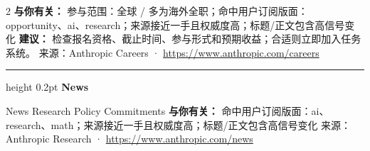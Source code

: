 \documentclass[10.5pt]{ctexart}
\begin{document}
\begin{multicols}{2}
\textbf{与你有关：} 参与范围：全球 / 多为海外全职；命中用户订阅版面：opportunity、ai、research；来源接近一手且权威度高；标题/正文包含高信号变化
\textbf{建议：} 检查报名资格、截止时间、参与形式和预期收益；合适则立即加入任务系统。
{\footnotesize\color{ormuted} 来源：Anthropic Careers · \url{https://www.anthropic.com/careers}}
\vspace{2mm}
\hrule height 0.2pt
\vspace{2mm}
{\large\bfseries News}\par
News Research Policy Commitments
\textbf{与你有关：} 命中用户订阅版面：ai、research、math；来源接近一手且权威度高；标题/正文包含高信号变化
{\footnotesize\color{ormuted} 来源：Anthropic Research · \url{https://www.anthropic.com/news}}
\end{multicols}
\end{document}
